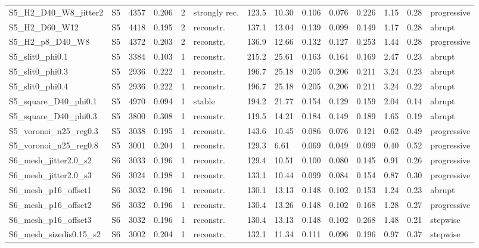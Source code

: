 \begin{landscape}
\begin{longtable}{llllllllllllll}
S5\_H2\_D40\_W8\_jitter2 & S5 & 4357 & 0.206 & 2 & strongly rec. & 123.5 & 10.30 & 0.106 & 0.076 & 0.226 & 1.15 & 0.28 & progressive\\
S5\_H2\_D60\_W12 & S5 & 4418 & 0.195 & 2 & reconstr. & 137.1 & 13.04 & 0.139 & 0.099 & 0.149 & 1.17 & 0.28 & abrupt\\
S5\_H2\_p8\_D40\_W8 & S5 & 4372 & 0.203 & 2 & reconstr. & 136.9 & 12.66 & 0.132 & 0.127 & 0.253 & 1.44 & 0.28 & progressive\\
S5\_slit0\_phi0.1 & S5 & 3384 & 0.103 & 1 & reconstr. & 215.2 & 25.61 & 0.163 & 0.164 & 0.169 & 2.47 & 0.23 & abrupt\\
S5\_slit0\_phi0.3 & S5 & 2936 & 0.222 & 1 & reconstr. & 196.7 & 25.18 & 0.205 & 0.206 & 0.211 & 3.24 & 0.23 & abrupt\\
S5\_slit0\_phi0.4 & S5 & 2936 & 0.222 & 1 & reconstr. & 196.7 & 25.18 & 0.205 & 0.206 & 0.211 & 3.24 & 0.22 & abrupt\\
S5\_square\_D40\_phi0.1 & S5 & 4970 & 0.094 & 1 & stable & 194.2 & 21.77 & 0.154 & 0.129 & 0.159 & 2.04 & 0.14 & abrupt\\
S5\_square\_D40\_phi0.3 & S5 & 3800 & 0.308 & 1 & reconstr. & 119.5 & 14.21 & 0.184 & 0.149 & 0.189 & 1.65 & 0.19 & abrupt\\
S5\_voronoi\_n25\_reg0.3 & S5 & 3038 & 0.195 & 1 & reconstr. & 143.6 & 10.45 & 0.086 & 0.076 & 0.121 & 0.62 & 0.49 & progressive\\
S5\_voronoi\_n25\_reg0.8 & S5 & 3001 & 0.204 & 1 & reconstr. & 129.3 & 6.61 & 0.069 & 0.049 & 0.099 & 0.40 & 0.52 & progressive\\
S6\_mesh\_jitter2.0\_s2 & S6 & 3033 & 0.196 & 1 & reconstr. & 129.4 & 10.51 & 0.100 & 0.080 & 0.145 & 0.91 & 0.26 & progressive\\
S6\_mesh\_jitter2.0\_s3 & S6 & 3024 & 0.198 & 1 & reconstr. & 133.1 & 10.44 & 0.099 & 0.084 & 0.154 & 0.87 & 0.30 & progressive\\
S6\_mesh\_p16\_offset1 & S6 & 3032 & 0.196 & 1 & reconstr. & 130.1 & 13.13 & 0.148 & 0.102 & 0.153 & 1.24 & 0.23 & abrupt\\
S6\_mesh\_p16\_offset2 & S6 & 3032 & 0.196 & 1 & reconstr. & 130.4 & 13.26 & 0.148 & 0.102 & 0.168 & 1.28 & 0.27 & progressive\\
S6\_mesh\_p16\_offset3 & S6 & 3032 & 0.196 & 1 & reconstr. & 130.4 & 13.13 & 0.148 & 0.102 & 0.268 & 1.48 & 0.21 & stepwise\\
S6\_mesh\_sizedis0.15\_s2 & S6 & 3002 & 0.204 & 1 & reconstr. & 132.1 & 11.34 & 0.111 & 0.096 & 0.196 & 0.97 & 0.37 & stepwise\\

\end{longtable}
\end{landscape}
